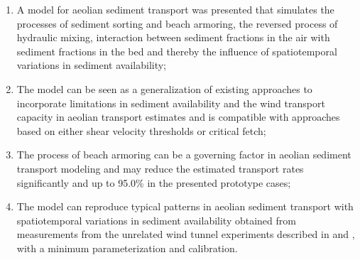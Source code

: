 \begin{enumerate}
\item A model for aeolian sediment transport was presented that
  simulates the processes of sediment sorting and beach armoring, the
  reversed process of hydraulic mixing, interaction between sediment
  fractions in the air with sediment fractions in the bed and thereby
  the influence of spatiotemporal variations in sediment availability;
\item The model can be seen as a generalization of existing approaches
  to incorporate limitations in sediment availability and the wind
  transport capacity in aeolian transport estimates and is compatible
  with approaches based on either shear velocity thresholds or
  critical fetch;
\item The process of beach armoring can be a
  governing factor in aeolian sediment transport modeling and may
  reduce the estimated transport rates significantly and up to 95.0\% in
  the presented prototype cases;
\item The model can reproduce typical patterns in aeolian sediment
  transport with spatiotemporal variations in sediment availability
  obtained from measurements from the unrelated wind tunnel
  experiments described in \citet{Nickling1995} and \citet{Dong2004b},
  with a minimum parameterization and calibration.
\end{enumerate}

